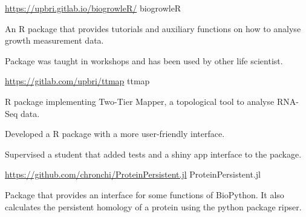 

\begin{cventries}

\cventry
  {\url{https://upbri.gitlab.io/biogrowleR/}} %
  {biogrowleR} %
  {}{}
  {
    \begin{cvitems} %
      \item {An R package that provides tutorials and auxiliary 
             functions on how to analyse growth measurement data.}
      \item {Package was taught in workshops and has been used by
            other life scientist.}
    \end{cvitems}
  }


\cventry
  {\url{https://gitlab.com/upbri/ttmap}} %
  {ttmap} %
  {}{}
  {
    \begin{cvitems} %
      \item {R package implementing Two-Tier Mapper, a 
             topological tool to analyse RNA-Seq data.}
      \item {Developed a R package with a more user-friendly interface.}
      \item {Supervised a student that added tests and a shiny app interface
            to the package.} 
    \end{cvitems}
  }



\cventry
  {\url{https://github.com/chronchi/ProteinPersistent.jl}} %
  {ProteinPersistent.jl} %
  {}{}
  {
    \begin{cvitems} %
      \item {Package that provides an interface for some functions of BioPython.
      It also calculates the persistent homology of a protein using the python
      package ripser.}
    \end{cvitems}
  }


\end{cventries}

